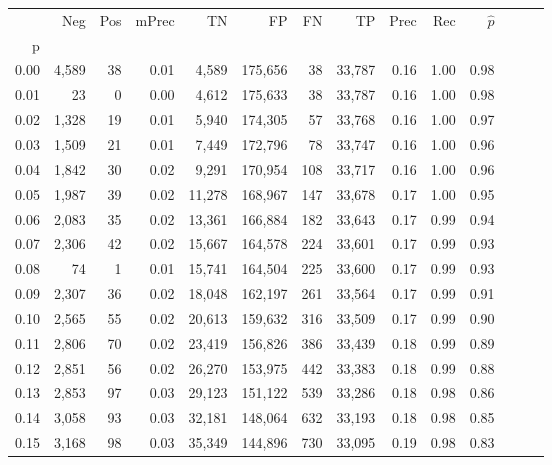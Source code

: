 \begin{tabular}{rrrrrrrrrrrrrr}
\toprule
{} &    Neg &    Pos & mPrec &       TN &       FP &      FN &      TP &  Prec &   Rec & $\hat{p}$ \\
p    &        &        &       &          &          &         &         &       &       &           \\
\midrule
0.00 &  4,589 &     38 &  0.01 &    4,589 &  175,656 &      38 &  33,787 &  0.16 &  1.00 &      0.98 \\
0.01 &     23 &      0 &  0.00 &    4,612 &  175,633 &      38 &  33,787 &  0.16 &  1.00 &      0.98 \\
0.02 &  1,328 &     19 &  0.01 &    5,940 &  174,305 &      57 &  33,768 &  0.16 &  1.00 &      0.97 \\
0.03 &  1,509 &     21 &  0.01 &    7,449 &  172,796 &      78 &  33,747 &  0.16 &  1.00 &      0.96 \\
0.04 &  1,842 &     30 &  0.02 &    9,291 &  170,954 &     108 &  33,717 &  0.16 &  1.00 &      0.96 \\
0.05 &  1,987 &     39 &  0.02 &   11,278 &  168,967 &     147 &  33,678 &  0.17 &  1.00 &      0.95 \\
0.06 &  2,083 &     35 &  0.02 &   13,361 &  166,884 &     182 &  33,643 &  0.17 &  0.99 &      0.94 \\
0.07 &  2,306 &     42 &  0.02 &   15,667 &  164,578 &     224 &  33,601 &  0.17 &  0.99 &      0.93 \\
0.08 &     74 &      1 &  0.01 &   15,741 &  164,504 &     225 &  33,600 &  0.17 &  0.99 &      0.93 \\
0.09 &  2,307 &     36 &  0.02 &   18,048 &  162,197 &     261 &  33,564 &  0.17 &  0.99 &      0.91 \\
0.10 &  2,565 &     55 &  0.02 &   20,613 &  159,632 &     316 &  33,509 &  0.17 &  0.99 &      0.90 \\
0.11 &  2,806 &     70 &  0.02 &   23,419 &  156,826 &     386 &  33,439 &  0.18 &  0.99 &      0.89 \\
0.12 &  2,851 &     56 &  0.02 &   26,270 &  153,975 &     442 &  33,383 &  0.18 &  0.99 &      0.88 \\
0.13 &  2,853 &     97 &  0.03 &   29,123 &  151,122 &     539 &  33,286 &  0.18 &  0.98 &      0.86 \\
0.14 &  3,058 &     93 &  0.03 &   32,181 &  148,064 &     632 &  33,193 &  0.18 &  0.98 &      0.85 \\
0.15 &  3,168 &     98 &  0.03 &   35,349 &  144,896 &     730 &  33,095 &  0.19 &  0.98 &      0.83 \\

\end{tabular}

